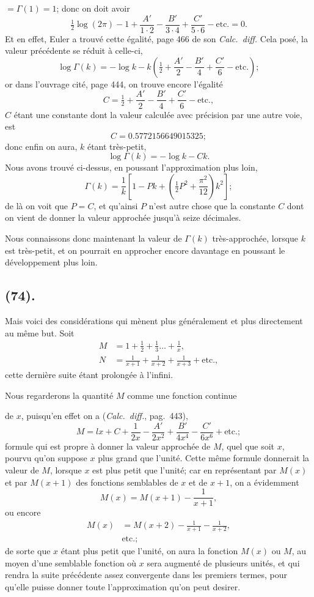 \documentclass{article}
\begin{document}
$=\Gamma(1)=1$; donc on doit avoir
\[ \tfrac{1}{2}\log(2\pi)-1+\frac{A'}{1\cdot2}-\frac{B'}{3\cdot4}+\frac{C'}{5\cdot6}-\text{etc.}=0. \]
Et en effet, Euler a trouvé cette égalité, page 466 de son \emph{Calc.\ diff.} Cela posé, la valeur précédente se réduit à celle-ci,
\[ \log\Gamma(k)=-\log k-k\left(\tfrac{1}{2}+\frac{A'}{2}-\frac{B'}{4}+\frac{C'}{6}-\text{etc.}\right); \]
or dans l'ouvrage cité, page 444, on trouve encore l'égalité
\[ C=\tfrac{1}{2}+\frac{A'}{2}-\frac{B'}{4}+\frac{C'}{6}-\text{etc.}, \]
$C$ étant une constante dont la valeur calculée avec précision par une autre voie, est
\[ C=0.5772156649015325; \]
donc enfin on aura, $k$ étant très-petit,
\[ \log\Gamma(k)=-\log k-Ck. \]
Nous avons trouvé ci-dessus, en poussant l'approximation plus loin,
\[ \Gamma(k)=\frac{1}{k}\left[1-Pk+\left(\tfrac{1}{2}P^{2}+\frac{\pi^{2}}{12}\right)k^{2}\right]; \]
de là on voit que $P=C$, et qu'ainsi $P$ n'est autre chose que la constante $C$ dont on vient de donner la valeur approchée jusqu'à seize décimales.

Nous connaissons donc maintenant la valeur de $\Gamma(k)$ très-approchée, lorsque $k$ est très-petit, et on pourrait en approcher encore davantage en poussant le développement plus loin.

\subsection*{(74).}

Mais voici des considérations qui mènent plus généralement et plus directement au même but. Soit
\[ \begin{aligned} M&=1+\tfrac{1}{2}+\tfrac{1}{3}\ldots+\frac{1}{x},\\ N&=\frac{1}{x+1}+\frac{1}{x+2}+\frac{1}{x+3}+\text{etc.}, \end{aligned} \]
cette dernière suite étant prolongée à l'infini.

Nous regarderons la quantité $M$ comme une fonction continue

de $x$, puisqu'en effet on a (\emph{Calc.\ diff.}, pag.\ 443),
\[ M=lx+C+\frac{1}{2x}-\frac{A'}{2x^{2}}+\frac{B'}{4x^{4}}-\frac{C'}{6x^{6}}+\text{etc.}; \]
formule qui est propre à donner la valeur approchée de $M$, quel que soit $x$, pourvu qu'on suppose $x$ plus grand que l'unité. Cette même formule donnerait la valeur de $M$, lorsque $x$ est plus petit que l'unité; car en représentant par $M(x)$ et par $M(x+1)$ des fonctions semblables de $x$ et de $x+1$, on a évidemment
\[ M(x)=M(x+1)-\frac{1}{x+1}, \]
ou encore
\[ \begin{aligned} M(x)&=M(x+2)-\frac{1}{x+1}-\frac{1}{x+2},\\ &\text{etc.}; \end{aligned} \]
de sorte que $x$ étant plus petit que l'unité, on aura la fonction $M(x)$ ou $M$, au moyen d'une semblable fonction où $x$ sera augmenté de plusieurs unités, et qui rendra la suite précédente assez convergente dans les premiers termes, pour qu'elle puisse donner toute l'approximation qu'on peut desirer.
\end{document}
